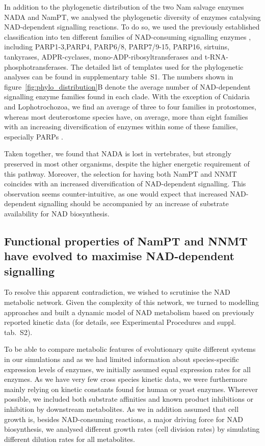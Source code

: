 In addition to the phylogenetic distribution of the two Nam salvage enzymes NADA and NamPT, we analysed the phylogenetic diversity of enzymes catalysing NAD-dependent signalling reactions. To do so, we used the previously established classification into ten different families of NAD-consuming signalling enzymes \cite{Gossmann2012FEBS}, including PARP1-3,PARP4, PARP6/8, PARP7/9-15, PARP16, sirtuins, tankyrases, ADPR-cyclases, mono-ADP-ribosyltransferases and t-RNA-phosphotransferases. The detailed list of templates used for the phylogenetic analyses can be found in supplementary table~S1. The numbers shown in figure~\ref{fig:phylo_distribution}B denote the average number of NAD-dependent signalling enzyme families found in each clade. With the exception of Cnidaria and Lophotrochozoa, we find an average of three to four families in protostomes, whereas most deuterostome species have, on average, more than eight families with an increasing diversification of enzymes within some of these families, especially PARPs \cite{Gossmann2014DNAR}.

Taken together, we found that NADA is lost in vertebrates, but strongly preserved in most other organisms, despite the higher energetic requirement of this pathway. Moreover, the selection for having both NamPT and NNMT coincides with an increased diversification of NAD-dependent signalling. This observation seems counter-intuitive, as one would expect that increased NAD-dependent signalling should be accompanied by an increase of substrate availability for NAD biosynthesis.


\subsection{Functional properties of NamPT and NNMT have evolved to maximise NAD-dependent signalling}

To resolve this apparent contradiction, we wished to scrutinise the NAD metabolic network. Given the complexity of this network, we turned to modelling approaches and built a dynamic model of NAD metabolism based on previously reported kinetic data (for details, see Experimental Procedures and suppl. tab.~S2).

To be able to compare metabolic features of evolutionary quite different systems in our simulations and as we had limited information about species-specific expression levels of enzymes, we initially assumed equal expression rates for all enzymes. As we have very few cross species kinetic data, we were furthermore mainly relying on kinetic constants found for human or yeast enzymes. Wherever possible, we included both substrate affinities and known product inhibitions or inhibition by downstream metabolites. As we in addition assumed that cell growth is, besides NAD-consuming reactions, a major driving force for NAD biosynthesis, we analysed different growth rates (cell division rates) by simulating different dilution rates for all metabolites.

